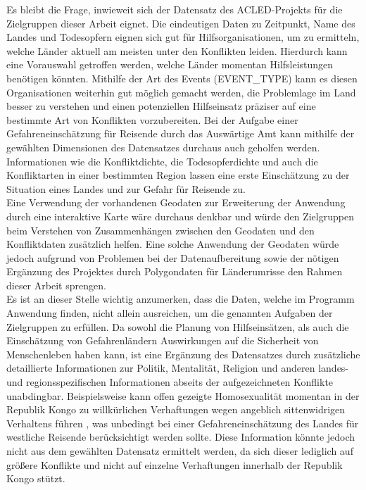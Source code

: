 \documentclass[usegeometry=true]{scrartcl}
\begin{document}
Es bleibt die Frage, inwieweit sich der Datensatz des ACLED-Projekts für die Zielgruppen dieser Arbeit eignet. Die eindeutigen Daten zu Zeitpunkt, Name des Landes und Todesopfern eignen sich gut für Hilfsorganisationen, um zu ermitteln, welche Länder aktuell am meisten unter den Konflikten leiden. Hierdurch kann eine Vorauswahl getroffen werden, welche Länder momentan Hilfsleistungen benötigen könnten. Mithilfe der Art des Events (EVENT\_TYPE) kann es diesen Organisationen weiterhin gut möglich gemacht werden, die Problemlage im Land besser zu verstehen und einen potenziellen Hilfseinsatz präziser auf eine bestimmte Art von Konflikten vorzubereiten. Bei der Aufgabe einer Gefahreneinschätzung für Reisende durch das Auswärtige Amt kann mithilfe der gewählten Dimensionen des Datensatzes durchaus auch geholfen werden. Informationen wie die Konfliktdichte, die Todesopferdichte und auch die Konfliktarten in einer bestimmten Region lassen eine erste Einschätzung zu der Situation eines Landes und zur Gefahr für Reisende zu.\\ Eine Verwendung der vorhandenen Geodaten zur Erweiterung der Anwendung durch eine interaktive Karte wäre durchaus denkbar und würde den Zielgruppen beim Verstehen von Zusammenhängen zwischen den Geodaten und den Konfliktdaten zusätzlich helfen. Eine solche Anwendung der Geodaten würde jedoch aufgrund von Problemen bei der Datenaufbereitung sowie der nötigen Ergänzung des Projektes durch Polygondaten für Länderumrisse den Rahmen dieser Arbeit sprengen.\\ Es ist an dieser Stelle wichtig anzumerken, dass die Daten, welche im Programm Anwendung finden, nicht allein ausreichen, um die genannten Aufgaben der Zielgruppen zu erfüllen. Da sowohl die Planung von Hilfseinsätzen, als auch die Einschätzung von Gefahrenländern Auswirkungen auf die Sicherheit von Menschenleben haben kann, ist eine Ergänzung des Datensatzes durch zusätzliche detaillierte Informationen zur Politik, Mentalität, Religion und anderen landes- und regionsspezifischen Informationen abseits der aufgezeichneten Konflikte unabdingbar. Beispielsweise kann offen gezeigte Homosexualität momentan in der Republik Kongo zu willkürlichen Verhaftungen wegen angeblich sittenwidrigen Verhaltens führen \cite{aa-kongo}, was unbedingt bei einer Gefahreneinschätzung des Landes für westliche Reisende berücksichtigt werden sollte. Diese Information könnte jedoch nicht aus dem gewählten Datensatz ermittelt werden, da sich dieser lediglich auf größere Konflikte und nicht auf einzelne Verhaftungen innerhalb der Republik Kongo stützt.
\end{document}
